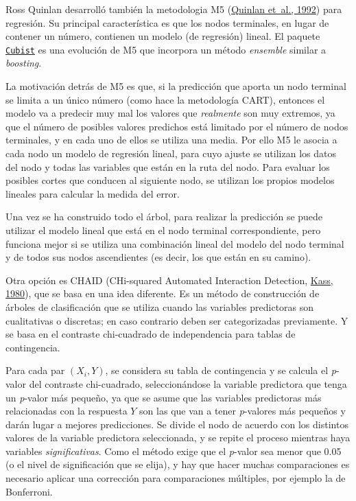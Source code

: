 \documentclass[
]{book}
\theoremstyle{break}
\theoremstyle{nonumberplain}
\begin{document}
Ross Quinlan desarrolló también la metodologia M5 (\protect\hyperlink{ref-quinlan1992learning}{Quinlan et~al., 1992}) para regresión.
Su principal característica es que los nodos terminales, en lugar de contener un número, contienen un modelo (de regresión) lineal.
El paquete \href{https://topepo.github.io/Cubist}{\texttt{Cubist}} es una evolución de M5 que incorpora un método \emph{ensemble} similar a \emph{boosting}.

La motivación detrás de M5 es que, si la predicción que aporta un nodo terminal se limita a un único número (como hace la metodología CART), entonces el modelo va a predecir muy mal los valores que \emph{realmente} son muy extremos, ya que el número de posibles valores predichos está limitado por el número de nodos terminales, y en cada uno de ellos se utiliza una media.
Por ello M5 le asocia a cada nodo un modelo de regresión lineal, para cuyo ajuste se utilizan los datos del nodo y todas las variables que están en la ruta del nodo.
Para evaluar los posibles cortes que conducen al siguiente nodo, se utilizan los propios modelos lineales para calcular la medida del error.

Una vez se ha construido todo el árbol, para realizar la predicción se puede utilizar el modelo lineal que está en el nodo terminal correspondiente, pero funciona mejor si se utiliza una combinación lineal del modelo del nodo terminal y de todos sus nodos ascendientes (es decir, los que están en su camino).

Otra opción es CHAID (CHi-squared Automated Interaction Detection, \protect\hyperlink{ref-kass1980exploratory}{Kass, 1980}), que se basa en una idea diferente. Es un método de construcción de árboles de clasificación que se utiliza cuando las variables predictoras son cualitativas o discretas; en caso contrario deben ser categorizadas previamente.
Y se basa en el contraste chi-cuadrado de independencia para tablas de contingencia.

Para cada par \((X_i, Y)\), se considera su tabla de contingencia y se calcula el \emph{p}-valor del contraste chi-cuadrado, seleccionándose la variable predictora que tenga un \emph{p}-valor más pequeño, ya que se asume que las variables predictoras más relacionadas con la respuesta \(Y\) son las que van a tener \emph{p}-valores más pequeños y darán lugar a mejores predicciones.
Se divide el nodo de acuerdo con los distintos valores de la variable predictora seleccionada, y se repite el proceso mientras haya variables \emph{significativas}.
Como el método exige que el \emph{p}-valor sea menor que 0.05 (o el nivel de significación que se elija), y hay que hacer muchas comparaciones es necesario aplicar una corrección para comparaciones múltiples, por ejemplo la de Bonferroni.
\end{document}
